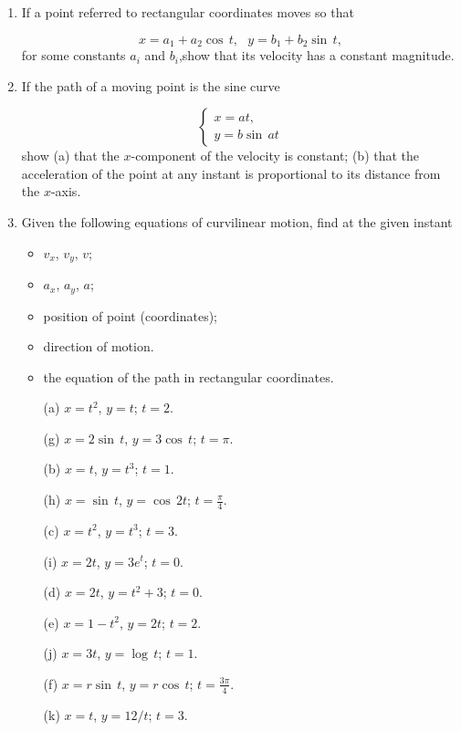 \begin{enumerate}
\item
 If a point referred to rectangular coordinates moves so that

\[
x = a_1+a_2\cos\,t , \ \ \ y = b_1+b_2\sin\, t ,
\]
for some constants $a_i$ and $b_i$,show that its velocity has a 
constant magnitude.

\item
 If the path of a moving point is the sine curve

\[
\begin{cases} 
x = at, \\ 
y = b \sin\, at 
\end{cases}
\]
show (a) that the $x$-component of the velocity is constant; (b) that 
the acceleration of the point at any instant is proportional 
to its distance from the $x$-axis.

\item
Given the following equations of curvilinear motion, 
find at the given instant 

\begin{itemize}
\item
$v_x$, $v_y$, $v$;
\item
$a_x$, $a_y$, $a$; 
\item
position of point (coordinates); 
\item
direction of motion. 
\item
the equation of the path in rectangular coordinates.
\end{itemize}

\begin{itemize}
\item[(a)] 
$x = t^2$, $y = t$; $t = 2$.

\item[(g)] 
$x = 2\sin\, t$, $y = 3\cos\, t$; $t = \pi$.

\item[(b)] 
$x = t$, $y = t^3$; $t = 1$.
 	
\item[(h)] 
$x = \sin\, t$, $y = \cos\, 2t$; $t = \frac{\pi}{4}$.

\item[(c)] 
$x = t^2$, $y = t^3$; $t = 3$.
 	
\item[(i)] 
$x = 2t$, $y = 3e^t$; $t = 0$.

\item[(d)] 
$x = 2t$, $y = t^2 + 3$; $t = 0$.

\item[(e)] 
$x = 1 - t^2$, $y = 2t$; $t = 2$.
 	
\item[(j)] 
$x = 3t$, $y = \log\, t$; $t = 1$.

\item[(f)] 
$x = r \sin\, t$, $y = r \cos\, t$; 
$t = \frac{3\pi}{4}$.
 	
\item[(k)] 
$x = t$, $y = 12/t$; $t = 3$.

\end{itemize}

\end{enumerate}

